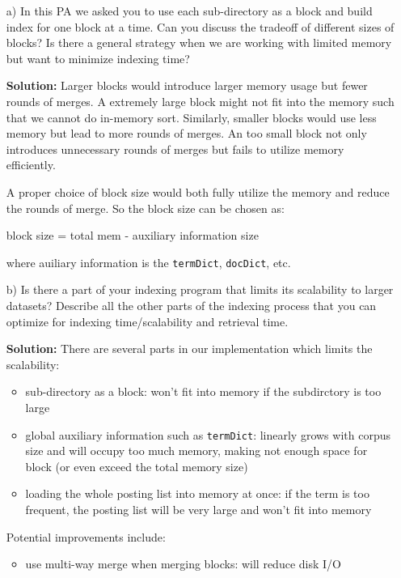 \documentclass{article}
\begin{document}
\begin{itemize}
  \item[a)] In this PA we asked you to use each sub-directory as a block and build
  index for one block at a time. Can you discuss the tradeoff of different
  sizes of blocks? Is there a general strategy when we are working with
  limited memory but want to minimize indexing time?
  
  \textbf{Solution:} Larger blocks would introduce larger memory usage but
  fewer rounds of merges. A extremely large block might not fit into the
  memory such that we cannot do in-memory sort. Similarly, smaller blocks
  would use less memory but lead to more rounds of merges. An too small block
  not only introduces unnecessary rounds of merges but fails to utilize memory
  efficiently.
  
  A proper choice of block size would both fully utilize the memory and reduce
  the rounds of merge. So the block size can be chosen as:
  
  \begin{center}
    block size = total mem - auxiliary information size
  \end{center}
  
  where auiliary information is the {\texttt{termDict}}, {\texttt{docDict}}, etc.
  
  \item[b)] Is there a part of your indexing program that limits its scalability
  to larger datasets? Describe all the other parts of the indexing process
  that you can optimize for indexing time/scalability and retrieval time.
  
  \textbf{Solution:} There are several parts in our implementation which
  limits the scalability:
  \begin{itemize}
    \item sub-directory as a block: won't fit into memory if the subdirctory
    is too large
    
    \item global auxiliary information such as {\texttt{termDict}}: linearly
    grows with corpus size and will occupy too much memory, making not enough
    space for block (or even exceed the total memory size)
    
    \item loading the whole posting list into memory at once: if the term is
    too frequent, the posting list will be very large and won't fit into
    memory
  \end{itemize}
  Potential improvements include:
  \begin{itemize}
    \item use multi-way merge when merging blocks: will reduce disk I/O
    

\end{itemize}
\end{itemize}
\end{document}
